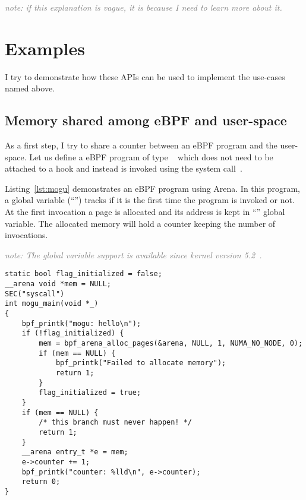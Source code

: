 \documentclass{article}
\begin{document}
\textcolor{gray}{\emph{note: if this explanation is vague, it is because I need
to learn more about it.}}



\section{Examples}

I try to demonstrate how these APIs can be used to implement the use-cases named
above.

\subsection{Memory shared among eBPF and user-space}

As a first step, I try to share a counter between an eBPF program and the
user-space. Let us define a eBPF program of type
~\cite{ebpf_docs_prog_syscall} which does not need to
be attached to a hook and instead is invoked using the 
system call~\cite{ebpf_docs_bpf_prog_run}.

Listing~\ref{lst:mogu} demonstrates an eBPF program using Arena. In this
program, a global variable (``'') tracks if it is the first
time the program is invoked or not. At the first invocation a page is allocated
and its address is kept in ``'' global variable. The allocated memory
will hold a counter keeping the number of invocations.

\textcolor{gray}{\textit{note: The global variable support is available since kernel version 5.2~\cite{glb_var_post}.}}

\begin{minipage}{\linewidth}
\begin{flushleft}
\begin{lstlisting}[caption={An eBPF program using Arena.}, label={lst:mogu}]
static bool flag_initialized = false;
__arena void *mem = NULL;
SEC("syscall")
int mogu_main(void *_)
{
    bpf_printk("mogu: hello\n");
    if (!flag_initialized) {
        mem = bpf_arena_alloc_pages(&arena, NULL, 1, NUMA_NO_NODE, 0);
        if (mem == NULL) {
            bpf_printk("Failed to allocate memory");
            return 1;
        }
        flag_initialized = true;
    }
    if (mem == NULL) {
        /* this branch must never happen! */
        return 1;
    }
    __arena entry_t *e = mem;
    e->counter += 1;
    bpf_printk("counter: %lld\n", e->counter);
    return 0;
}
\end{lstlisting}
\end{flushleft}
\end{minipage}
\end{document}
